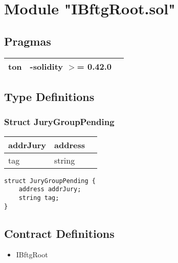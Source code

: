 
\section{Module "IBftgRoot.sol"}


\subsection{Pragmas}


\noindent\begin{tabular}{|l|l|p{5cm}|}\hline
ton & -solidity $>$= 0.42.0 &\\\hline
\end{tabular}


\subsection{Type Definitions}


\subsubsection{Struct JuryGroupPending}


\ifsoltables
\noindent\begin{tabular}{|l|l|p{6cm}|}\hline
addrJury & address & \\\hline
tag & string & \\\hline
\end{tabular}
\fi


\begin{lstlisting}[firstnumber=3]
struct JuryGroupPending {
    address addrJury;
    string tag;
}
\end{lstlisting}

\subsection{Contract Definitions}

\begin{itemize}
\item IBftgRoot
\end{itemize}
